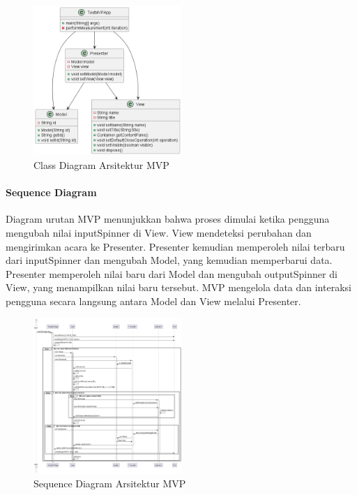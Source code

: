 \documentclass[conference]{IEEEtran}
\begin{document}
	\begin{figure}[h]
		\centering
		\includegraphics[width=0.5\textwidth]{../uml/mvp_diagram.png}
		\caption{Class Diagram Arsitektur MVP}
		\label{fig:class_mvp}
	\end{figure}
	
	\paragraph{Sequence Diagram}
	Diagram urutan MVP menunjukkan bahwa proses dimulai ketika pengguna mengubah nilai inputSpinner di View. View mendeteksi perubahan dan mengirimkan acara ke Presenter. Presenter kemudian memperoleh nilai terbaru dari inputSpinner dan mengubah Model, yang kemudian memperbarui data. Presenter memperoleh nilai baru dari Model dan mengubah outputSpinner di View, yang menampilkan nilai baru tersebut. MVP mengelola data dan interaksi pengguna secara langsung antara Model dan View melalui Presenter.
	
	\begin{figure}[h]
		\centering
		\includegraphics[width=0.5\textwidth]{../uml/mvp_sequence.png}
		\caption{Sequence Diagram Arsitektur MVP}
		\label{fig:sequence_mvp}
	\end{figure}
	
\end{document}
